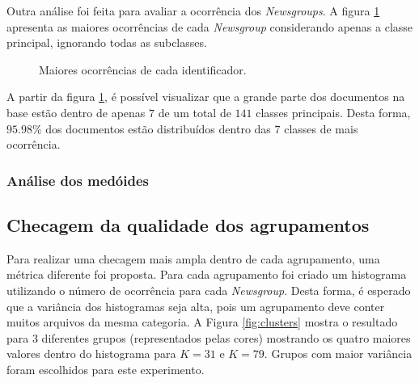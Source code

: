 \documentclass[conference]{IEEEtran}
\begin{document}
Outra análise foi feita para avaliar a ocorrência dos \emph{Newsgroups}. A figura \ref{fig:occurrence_word} apresenta as maiores ocorrências de cada \emph{Newsgroup} considerando apenas a classe principal, ignorando todas as subclasses.

\begin{figure}[!h]
	\centering
	{
	}
	\caption{\small Maiores ocorrências de cada identificador.}
	\label{fig:occurrence_word}
\end{figure}

A partir da figura \ref{fig:occurrence_word}, é possível visualizar que a grande parte dos documentos na base estão dentro de apenas $7$ de um total de $141$ classes principais. Desta forma, $95.98\%$ dos documentos estão distribuídos dentro das $7$ classes de mais ocorrência.

\subsubsection{Análise dos medóides}




\subsection{Checagem da qualidade dos agrupamentos}

Para realizar uma checagem mais ampla dentro de cada agrupamento, uma métrica diferente foi proposta. Para cada agrupamento foi criado um histograma utilizando o número de ocorrência para cada \emph{Newsgroup}. Desta forma, é esperado que a variância dos histogramas seja alta, pois um agrupamento deve conter muitos arquivos da mesma categoria. A Figura \ref{fig:clusters} mostra o resultado para $3$ diferentes grupos (representados pelas cores) mostrando os quatro maiores valores dentro do histograma para $K = 31$ e $K = 79$. Grupos com maior variância foram escolhidos para este experimento.
\end{document}
